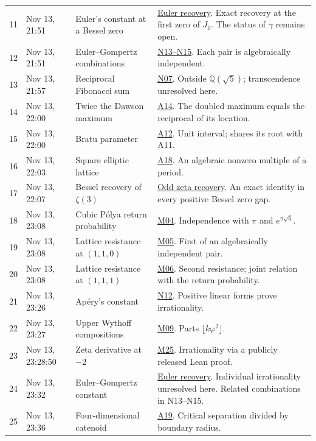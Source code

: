 \documentclass[11pt,a4paper]{article}
\theoremstyle{definition}
\theoremstyle{remark}
\begin{document}
{\begin{longtable}{@{}r>{\raggedright\arraybackslash}p{27mm}>{\raggedright\arraybackslash}p{39mm}>{\raggedright\arraybackslash}p{77mm}@{}}
11 & Nov 13, 21:51 & Euler's constant at a Bessel zero & \hyperref[sec:euler]{Euler recovery}. Exact recovery at the first zero of $J_0$. The status of $\gamma$ remains open. \\
12 & Nov 13, 21:51 & Euler--Gompertz combinations & \hyperlink{cat-N13}{N13--N15}. Each pair is algebraically independent. \\
13 & Nov 13, 21:57 & Reciprocal Fibonacci sum & \hyperlink{cat-N07}{N07}. Outside $\mathbb Q(\sqrt5)$; transcendence unresolved here. \\
14 & Nov 13, 22:00 & Twice the Dawson maximum & \hyperlink{cat-A14}{A14}. The doubled maximum equals the reciprocal of its location. \\
15 & Nov 13, 22:00 & Bratu parameter & \hyperlink{cat-A12}{A12}. Unit interval; shares its root with A11. \\
16 & Nov 13, 22:03 & Square elliptic lattice & \hyperlink{cat-A18}{A18}. An algebraic nonzero multiple of a period. \\
17 & Nov 13, 22:07 & Bessel recovery of $\zeta(3)$ & \hyperref[sec:odd]{Odd zeta recovery}. An exact identity in every positive Bessel zero gap. \\
18 & Nov 13, 23:08 & Cubic P\'olya return probability & \hyperlink{cat-M04}{M04}. Independence with $\pi$ and $e^{\pi\sqrt6}$. \\
19 & Nov 13, 23:08 & Lattice resistance at $(1,1,0)$ & \hyperlink{cat-M05}{M05}. First of an algebraically independent pair. \\
20 & Nov 13, 23:08 & Lattice resistance at $(1,1,1)$ & \hyperlink{cat-M06}{M06}. Second resistance; joint relation with the return probability. \\
21 & Nov 13, 23:26 & Ap\'ery's constant & \hyperlink{cat-N12}{N12}. Positive linear forms prove irrationality. \\
22 & Nov 13, 23:27 & Upper Wythoff compositions & \hyperlink{cat-M09}{M09}. Parts $\lfloor k\varphi^2\rfloor$. \\
23 & Nov 13, 23:28:50 & Zeta derivative at $-2$ & \hyperlink{cat-M25}{M25}. Irrationality via a publicly released Lean proof. \\
24 & Nov 13, 23:32 & Euler--Gompertz constant & \hyperref[sec:euler]{Euler recovery}. Individual irrationality unresolved here. Related combinations in N13--N15. \\
25 & Nov 13, 23:36 & Four-dimensional catenoid & \hyperlink{cat-A19}{A19}. Critical separation divided by boundary radius. \\

\end{longtable}}
\end{document}
